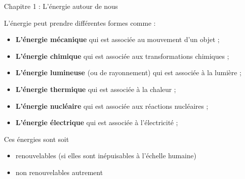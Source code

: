 \documentclass[24pt]{article}
\newcommand{\titre}{Chapitre 1 : L'énergie autour de nous} %
\begin{document}
\thispagestyle{fancy}
\cfoot{}

\begin{titlebox}{\titre}
    \setlength\parindent{4pt} %
    \setlength\parskip{5pt} 

    L’énergie peut prendre différentes formes comme :
    \begin{itemize}
        \item \textbf{\color{DarkRed} {L’énergie mécanique}} qui est associée au mouvement d’un objet ;
        \item \textbf{\color{DarkRed} {L’énergie chimique}} qui est associée aux transformations chimiques ;
        \item \textbf{\color{DarkRed} {L’énergie lumineuse }}(ou de rayonnement) qui est associée à la lumière ;
        \item \textbf{\color{DarkRed} {L’énergie thermique}} qui est associée à la chaleur ;
        \item \textbf{\color{DarkRed} {L’énergie nucléaire}} qui est associée aux réactions nucléaires ;
        \item \textbf{\color{DarkRed} {L’énergie électrique}} qui est associée à l'électricité ;
    \end{itemize}

    Ces énergies sont soit \begin{itemize}
        \item renouvelables (si elles sont inépuisables à l'échelle humaine)
        \item non renouvelables autrement
    \end{itemize}

    
    \vspace{50pt}

\end{titlebox}
\end{document}
